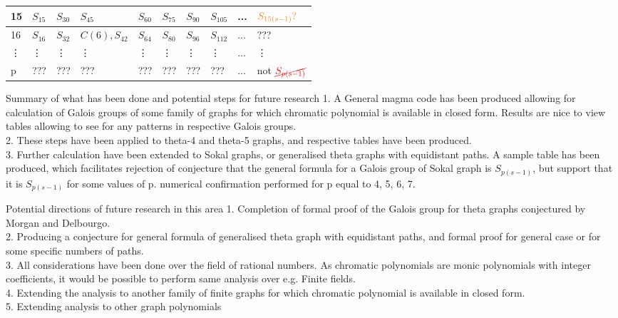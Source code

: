 \documentclass{beamer}
\begin{document}
\begin{frame}[shrink=10]
\begin{tabular}{| p{} | p{} | p{} | p{} | p{} | p{} | p{} | p{} | p{} | p{} | }
    \hline
    15 & $S_{15}$ & $S_{30}$ & $S_{45}$ & $S_{60}$ & $S_{75}$ & $S_{90}$ & $S_{105}$ & ... & $\color{BurntOrange} S_{15(s-1)}?$ \\ 
    \hline
    16 & $S_{16}$ & $S_{32}$ & $C(6), S_{42}$ & $S_{64}$ & $S_{80}$ & $S_{96}$ & $S_{112}$ & ... & ??? \\ 
    \hline
    \vdots & \vdots & \vdots & \vdots & \vdots & \vdots & \vdots & \vdots & ... & \vdots \\ 
    \hline
    p & ??? & ??? & ??? & ??? & ??? & ??? & ??? & ... & not $\color{red} \cancel{S_{p(s-1)}}$ \\ 
    \hline
\end{tabular}

\end{frame}


\begin{frame}{Summary of what has been done and potential steps for future research}
1. A General magma code has been produced allowing for calculation of Galois groups of some family of graphs for which chromatic polynomial is available in closed form. Results are nice to view tables allowing to see for any patterns in respective Galois groups.
\\
2. These steps have been applied to theta-4 and theta-5 graphs, and respective tables have been produced.
\\
3. Further calculation have been extended to Sokal graphs, or generalised theta graphs with equidistant paths. A sample table has been produced, which facilitates rejection of conjecture that the general formula for a Galois group of Sokal graph is $S_{p(s-1)}$, but support that it is $S_{p(s-1)}$ for some values of p. numerical confirmation performed for p equal to 4, 5, 6, 7. 
    
\end{frame}


\begin{frame}{Potential directions of future research in this area}
1. Completion of formal proof of the Galois group for theta graphs conjectured by Morgan and Delbourgo.
\\
2. Producing a conjecture for general formula of generalised theta graph with equidistant paths, and formal proof for general case or for some specific numbers of paths. 
\\
3. All considerations have been done over the field of rational numbers. As chromatic polynomials are monic polynomials with integer coefficients, it would be possible to perform same analysis over e.g. Finite fields.
\\
4. Extending the analysis to another family of finite graphs for which chromatic polynomial is available in closed form.
\\
5. Extending analysis to other graph polynomials
    
\end{frame}
\end{document}
